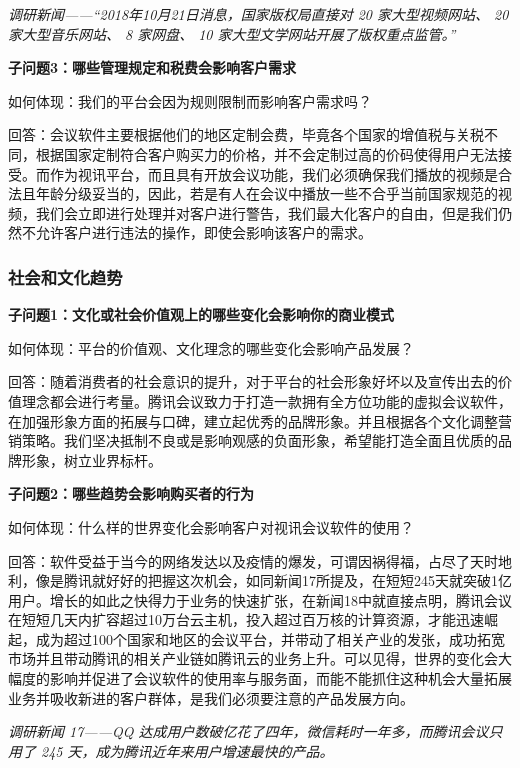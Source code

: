 \documentclass[a4paper,12pt]{article}
\begin{document}
    \textit{调研新闻——“2018年10⽉21⽇消息，国家版权局直接对 20 家⼤型视频⽹站、 20 家⼤型⾳乐⽹站、 8 家⽹盘、 10 家⼤型⽂学⽹站开展了版权重点监管。”}

    \textit{}

    \textbf{子问题3：哪些管理规定和税费会影响客户需求}

    如何体现：我们的平台会因为规则限制⽽影响客户需求吗？

    回答：会议软件主要根据他们的地区定制会费，毕竟各个国家的增值税与关税不同，根据国家定制符合客户购买⼒的价格，并不会定制过⾼的价码使得⽤户⽆法接受。⽽作为视讯平台，⽽且具有开放会议功能，我们必须确保我们播放的视频是合法且年龄分级妥当的，因此，若是有⼈在会议中播放⼀些不合乎当前国家规范的视频，我们会⽴即进⾏处理并对客户进⾏警告，我们最⼤化客户的⾃由，但是我们仍然不允许客户进⾏违法的操作，即使会影响该客户的需求。

    \subsubsection{社会和文化趋势}    
    \textbf{子问题1：文化或社会价值观上的哪些变化会影响你的商业模式}

    如何体现：平台的价值观、⽂化理念的哪些变化会影响产品发展？

    回答：随着消费者的社会意识的提升，对于平台的社会形象好坏以及宣传出去的价值理念都会进⾏考量。腾讯会议致⼒于打造⼀款拥有全⽅位功能的虚拟会议软件，在加强形象⽅⾯的拓展与⼝碑，建⽴起优秀的品牌形象。并且根据各个⽂化调整营销策略。我们坚决抵制不良或是影响观感的负⾯形象，希望能打造全⾯且优质的品牌形象，树⽴业界标杆。

    \textbf{子问题2：哪些趋势会影响购买者的行为}

    如何体现：什么样的世界变化会影响客户对视讯会议软件的使⽤？

    回答：软件受益于当今的⽹络发达以及疫情的爆发，可谓因祸得福，占尽了天时地利，像是腾讯就好好的把握这次机会，如同新闻17所提及，在短短245天就突破1亿⽤户。增长的如此之快得⼒于业务的快速扩张，在新闻18中就直接点明，腾讯会议在短短⼏天内扩容超过10万台云主机，投⼊超过百万核的计算资源，才能迅速崛起，成为超过100个国家和地区的会议平台，并带动了相关产业的发张，成功拓宽市场并且带动腾讯的相关产业链如腾讯云的业务上升。可以⻅得，世界的变化会⼤幅度的影响并促进了会议软件的使⽤率与服务⾯，⽽能不能抓住这种机会⼤量拓展业务并吸收新进的客户群体，是我们必须要注意的产品发展⽅向。

    \textit{调研新闻 17——QQ 达成⽤户数破亿花了四年，微信耗时⼀年多，⽽腾讯会议只⽤了 245 天，成为腾讯近年来⽤户增速最快的产品。}
    
\end{document}
